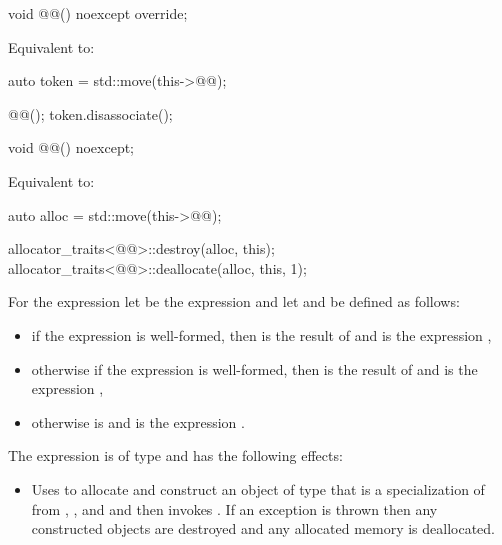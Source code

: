 %
\begin{itemdecl}
void @@() noexcept override;
\end{itemdecl}

\begin{itemdescr}
\pnum
\effects
Equivalent to:
\begin{codeblock}
auto token = std::move(this->@@);

@@();
token.disassociate();
\end{codeblock}
\end{itemdescr}

%
\begin{itemdecl}
void @@() noexcept;
\end{itemdecl}

\begin{itemdescr}
\pnum
\effects
Equivalent to:
\begin{codeblock}
auto alloc = std::move(this->@@);

allocator_traits<@@>::destroy(alloc, this);
allocator_traits<@@>::deallocate(alloc, this, 1);
\end{codeblock}
\end{itemdescr}

\pnum
For the expression 
let  be the expression  and
let  and  be defined as follows:
\begin{itemize}
\item
if the expression  is well-formed, then
 is the result of  and
 is the expression ,
\item
otherwise
if the expression  is well-formed, then
 is the result of  and
 is the expression ,
\item
otherwise
 is  and
 is the expression .
\end{itemize}

\pnum
The expression  is of type  and
has the following effects:
\begin{itemize}
\item
Uses  to allocate and construct an object  of
type that is a specialization of  from
, , and 
and then
invokes .
If an exception is thrown then
any constructed objects are destroyed and any allocated memory is deallocated.
\end{itemize}


